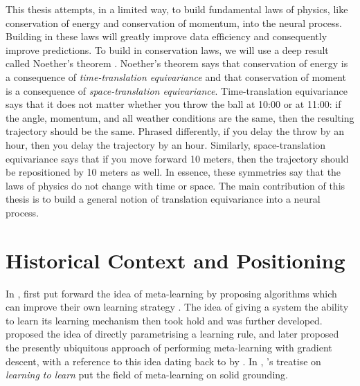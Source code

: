 \documentclass[12pt, twoside]{report}
\begin{document}
This thesis attempts, in a limited way, to build fundamental laws of physics, like conservation of energy and conservation of momentum, into the neural process.
Building in these laws will greatly improve data efficiency and consequently improve predictions.
To build in conservation laws, we will use a deep result called Noether's theorem \parencite{Noether:1918:Invariante_Variationsprobleme}.
Noether's theorem says that conservation of energy is a consequence of \emph{time-translation equivariance} and that conservation of moment is a consequence of \emph{space-translation equivariance}.
Time-translation equivariance says that it does not matter whether you throw the ball at 10:00 or at 11:00: if the angle, momentum, and all weather conditions are the same, then the resulting trajectory should be the same.
Phrased differently, if you delay the throw by an hour, then you delay the trajectory by an hour.
Similarly, space-translation equivariance says that if you move forward 10 meters, then the trajectory should be repositioned by 10 meters as well.
In essence, these symmetries say that the laws of physics do not change with time or space.
The main contribution of this thesis is to build a general notion of translation equivariance into a neural process.

\section{Historical Context and Positioning}
\label{sec:introduction:context}

In \citeyear{Schmidhuber:1987:Evolutionary_Principles_in_Self-Referential_Learning}, \citeauthor{Schmidhuber:1987:Evolutionary_Principles_in_Self-Referential_Learning} first put forward the idea of meta-learning by proposing algorithms which can improve their own learning strategy \parencite{Schmidhuber:1987:Evolutionary_Principles_in_Self-Referential_Learning,Schmidhuber:1992:Learning_to_Control_Fast-Weight_Memories,Schmidhuber:1993:A_Neural_Network_That_Embeds}.
The idea of giving a system the ability to learn its learning mechanism then took hold and was further developed.
\textcite{Bengio:1990:Learning_a_Synaptic_Learning_Rule,Bengio:1995:On_the_Search_for_New_Learning_Rules_in_ANNs} proposed the idea of directly parametrising a learning rule,
and later \textcite{Hochreiter:2001:Learning_to_Learn_Using_Gradient,Younger:2001:Meta-Learning_With_Backpropagation} proposed the presently ubiquitous approach of performing meta-learning with gradient descent, with a reference to this idea dating back to \citeyear{Schmidhuber:1991:A_Possibility_for_Implementing_Curiosity} by \citeauthor{Schmidhuber:1991:A_Possibility_for_Implementing_Curiosity}.
In \citeyear{Thrun:1998:Learning_to_Learn}, \citeauthor{Thrun:1998:Learning_to_Learn}'s treatise on \emph{learning to learn} put the field of meta-learning on solid grounding.
\end{document}
